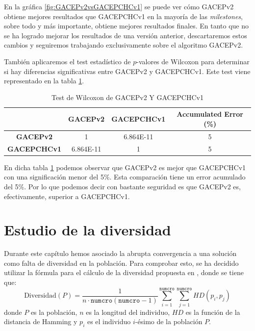 En la gráfica \ref{fig:GACEPv2vsGACEPCHCv1} se puede ver cómo GACEPv2 obtiene mejores resultados que GACEPCHCv1 en la mayoría de las \textit{milestones}, sobre todo y más importante, obtiene mejores resultados finales. 
En tanto que no se ha logrado mejorar los resultados de una versión anterior, descartaremos estos cambios y seguiremos trabajando exclusivamente sobre el algoritmo GACEPv2.

También aplicaremos el test estadístico de $p$-valores de Wilcoxon para determinar si hay diferencias significativas entre GACEPv2 y GACEPCHCv1. 
Este test viene representado en la tabla \ref{WilcoxonGACEPv4}.

\begin{table}[h]
\begin{tabular}{c|c|c|c|}
\cline{2-4}
\multicolumn{1}{l|}{}                     & \textbf{GACEPv2}                   & \textbf{GACEPCHCv1}              & \textbf{Accumulated Error   (\%)} \\ \hline
\multicolumn{1}{|c|}{\textbf{GACEPv2}}      & 1                                & {\color[HTML]{0000FF} 6.864E-11} & 5                                 \\ \hline
\multicolumn{1}{|c|}{\textbf{GACEPCHCv1}} & {\color[HTML]{FF0000} 6.864E-11} & 1                                & 5                                 \\ \hline
\end{tabular}
\caption{\label{WilcoxonGACEPv4}Test de Wilcoxon de GACEPv2 Y GACEPCHCv1}
\end{table}

En dicha tabla \ref{WilcoxonGACEPv4} podemos observar que GACEPv2 es mejor que GACEPCHCv1 con una significación menor del 5\%. 
Esta comparación tiene un error acumulado del 5\%. 
Por lo que podemos decir con bastante seguridad es que GACEPv2 es, efectivamente, superior a GACEPCHCv1.


\section{Estudio de la diversidad}

Durante este capítulo hemos asociado la abrupta convergencia a una solución como falta de diversidad en la población. 
Para comprobar esto, se ha decidido utilizar la fórmula para el cálculo de la diversidad propuesta en \parencite{oppacherShiftingBalanceGenetic1999a}, donde se tiene que:
\begin{equation}
\text{Diversidad}(P) = \dfrac{1}{n\cdot \texttt{numcro}(\texttt{numcro}-1)}\sum_{i=1}^{\texttt{numcro}}\sum_{j=1}^{\texttt{numcro}} HD(p_i,p_j)
\label{eq:Diversidad}
\end{equation}
donde $P$ es la población, $n$ es la longitud del individuo, $HD$ es la función de la distancia de Hamming y $p_i$ es el individuo $i$-ésimo de la población $P$.

